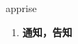 
\begin{frame}
{\huge apprise}
\begin{center}
\begin{enumerate}\Large
  \item \textbf{通知，告知}
\end{enumerate}
\end{center}
\end{frame}
